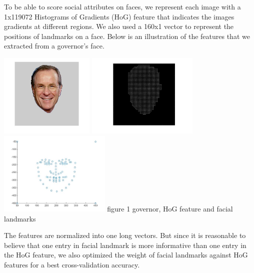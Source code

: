 \documentclass[12pt]{article}
\newenvironment{p2}[2][III Feature Designs]{\begin{trivlist}
\item[\hskip \labelsep {\bfseries #1}\hskip \labelsep {\bfseries #2}]}{\end{trivlist}}
\begin{document}
\begin{p2}{}
\item{}
To be able to score social attributes on faces, we represent each image with a 1x119072 Histograms of Gradients (HoG) feature that indicates the images gradients at different regions. We also used a 160x1 vector to represent the positions of landmarks on a face. Below is an illustration of the features that we extracted from a governor's face.
\\
\begin{center}
		\includegraphics[height=4cm]{sample_feature_gov.jpg}
		\includegraphics[height=4cm]{sample_feature_hog.jpg}
		\includegraphics[height=4cm]{sample_feature_landmark.jpg}
		figure 1 governor, HoG feature and facial landmarks
\end{center}
The features are normalized into one long vectors. But since it is reasonable to believe that one entry in facial landmark is more informative than one entry in the HoG feature, we also optimized the weight of facial landmarks against HoG features for a best cross-validation accuracy.
\end{p2}
\end{document}
